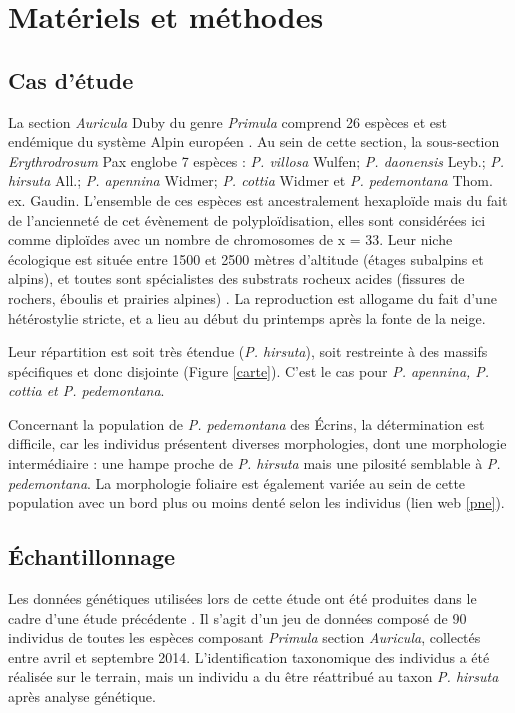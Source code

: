 \section{Matériels et méthodes}

\subsection{Cas d'étude}

La section \textit{Auricula} Duby du genre \textit{Primula} comprend 26 espèces et est endémique du système Alpin européen \citep{Ozenda1995}. Au sein de cette section, la sous-section \textit{Erythrodrosum} Pax englobe 7 espèces : \textit{P. villosa} Wulfen; \textit{P. daonensis} Leyb.; \textit{P. hirsuta} All.; \textit{P. apennina} Widmer; \textit{P. cottia} Widmer et \textit{P. pedemontana} Thom. ex. Gaudin. L'ensemble de ces espèces est ancestralement hexaploïde mais du fait de l'ancienneté de cet évènement de polyploïdisation, elles sont considérées ici comme diploïdes avec un nombre de chromosomes de x = 33. Leur niche écologique est située entre 1500 et 2500 mètres d'altitude (étages subalpins et alpins), et toutes sont spécialistes des substrats rocheux acides (fissures de rochers, éboulis et prairies alpines) \citep{Zhang2004}. La reproduction est allogame du fait d'une hétérostylie stricte, et a lieu au début du printemps après la fonte de la neige.

Leur répartition est soit très étendue (\textit{P. hirsuta}), soit restreinte à des massifs spécifiques et donc disjointe (Figure \ref{carte}). C'est le cas pour \textit{P. apennina, P. cottia et P. pedemontana}.

Concernant la population de \textit{P. pedemontana} des Écrins, la détermination est difficile, car les individus présentent diverses morphologies, dont une morphologie intermédiaire : une hampe proche de \textit{P. hirsuta} mais une pilosité semblable à \textit{P. pedemontana}. La morphologie foliaire est également variée au sein de cette population avec un bord plus ou moins denté selon les individus (lien web \ref{pne}).

\subsection{Échantillonnage}

Les données génétiques utilisées lors de cette étude ont été produites dans le cadre d'une étude précédente \citep{Boucher2016a}. Il s'agit d'un jeu de données composé de 90 individus de toutes les espèces composant \textit{Primula} section \textit{Auricula}, collectés entre avril et septembre 2014. L'identification taxonomique des individus a été réalisée sur le terrain, mais un individu a du être réattribué au taxon \textit{P. hirsuta} après analyse génétique.

